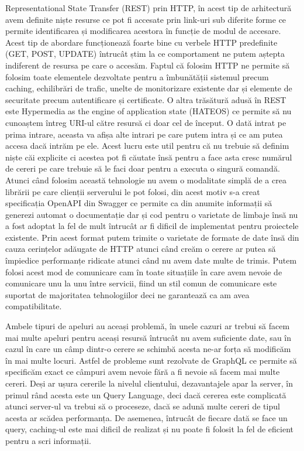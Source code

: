 Representational State Transfer (REST) prin HTTP, în acest tip de arhitectură avem definite 
niște resurse ce pot fi accesate prin link-uri sub diferite forme ce permite identificarea și
modificarea acestora în funcție de modul de accesare. Acest tip de abordare funcționează 
foarte bine cu verbele HTTP predefinite (GET, POST, UPDATE) întrucât știm la ce comportament 
ne putem aștepta indiferent de resursa pe care o accesăm. Faptul că folosim HTTP ne permite să
folosim toate elementele dezvoltate pentru a îmbunătății sistemul precum caching, echilibrări de trafic,
unelte de monitorizare existente dar și elemente de securitate precum autentificare și certificate.
O altra trăsătură adusă în REST este Hypermedia as the engine of application state (HATEOS) ce permite
să nu cunoaștem întreg URI-ul către resursă ci doar cel de început. O dată intrat pe prima intrare,
aceasta va afișa alte intrari pe care putem intra și ce am putea accesa dacă intrăm pe ele. Acest lucru
este util pentru că nu trebuie să definim niște căi explicite ci acestea pot fi căutate însă
pentru a face asta cresc numărul de cereri pe care trebuie să le faci doar pentru a executa o
singură comandă. Atunci când folosim această tehnologie nu avem o modalitate simplă de a crea
librării pe care clienții serverului le pot folosi, din acest motiv s-a creat specificația
OpenAPI din Swagger ce permite ca din anumite informații să generezi automat o documentație 
dar și cod pentru o varietate de limbaje însă nu a fost adoptat la fel de mult întrucât 
ar fi dificil de implementat pentru proiectele existente. Prin acest format putem trimite o
varietate de formate de date însă din cauza cerințelor adăugate de HTTP atunci când creăm o cerere
ar putea să împiedice performanțe ridicate atunci când nu avem date multe de trimis. Putem folosi
acest mod de comunicare cam în toate situațiile în care avem nevoie de comunicare unu la unu între
servicii, fiind un stil comun de comunicare este suportat de majoritatea tehnologiilor 
deci ne garantează ca am avea compatibilitate.  

Ambele tipuri de apeluri au aceași problemă, în unele cazuri ar trebui să facem mai multe 
apeluri pentru aceași resursă întrucât nu avem suficiente date, sau în cazul în care un 
câmp dintr-o cerere se schimbă acesta ne-ar forța să modificăm în mai multe locuri. Astfel de probleme
sunt rezolvate de GraphQL ce permite să specificăm exact ce câmpuri avem nevoie fără a fi nevoie
să facem mai multe cereri. Deși ar ușura cererile la nivelul clientului, dezavantajele apar 
la server, în primul rând acesta este un Query Language, deci dacă cererea este complicată
atunci server-ul va trebui să o proceseze, dacă se adună multe cereri de tipul acesta
ar scădea performanța. De asemenea, întrucât de fiecare dată se face un query, caching-ul 
este mai dificil de realizat și nu poate fi folosit la fel de eficient pentru a scri informații.

